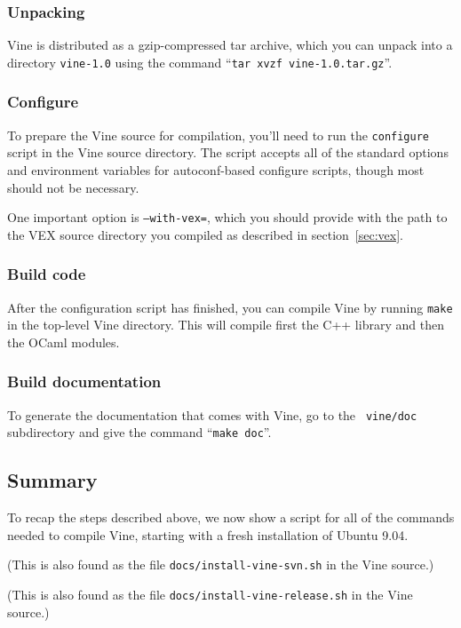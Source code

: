 \documentclass[11pt,onecolumn]{article}
\begin{document}
\begin{release}
\subsubsection{Unpacking}

Vine is distributed as a gzip-compressed tar archive, which you can
unpack into a directory {\tt vine-1.0} using the command ``{\tt tar xvzf
vine-1.0.tar.gz}''.

\end{release}

\subsubsection{Configure}

To prepare the Vine source for compilation, you'll need to run the
{\tt configure} script in the Vine source directory.
%
The script accepts all of the standard options and environment
variables for autoconf-based configure scripts, though most should not
be necessary.
\begin{svn}
One important option is {\tt --with-vex=}, which you should provide
with the path to the VEX source directory you compiled as described in
section~\ref{sec:vex}.
\end{svn}

\subsubsection{Build code}

After the configuration script has finished, you can compile Vine by
running {\tt make} in the top-level Vine directory.
%
This will compile first the C++ library and then the OCaml modules.

\subsubsection{Build documentation}

To generate the documentation that comes with Vine, go to the {\tt
  vine/doc} subdirectory and give the command ``{\tt make doc}''.

\subsection{Summary}

To recap the steps described above, we now show a script for all of
the commands needed to compile Vine, starting with a fresh
installation of Ubuntu 9.04.
\begin{svn}
(This is also found as the file
\verb'docs/install-vine-svn.sh' in the Vine source.)

\end{svn}
\begin{release}
(This is also found as the file
\verb'docs/install-vine-release.sh' in the Vine source.)

\end{release}
\end{document}
